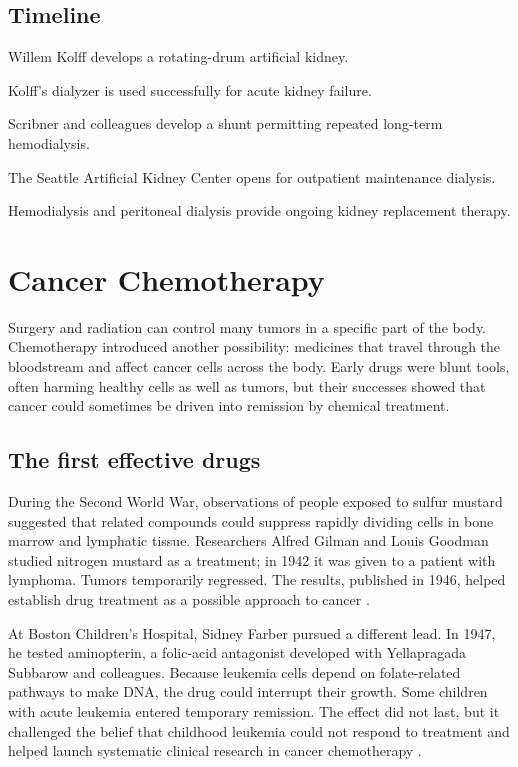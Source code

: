 \documentclass[12pt,oneside]{book}
\begin{document}
\section*{Timeline}
\begin{description}[leftmargin=2.3cm,style=nextline]
  \item[1940s] Willem Kolff develops a rotating-drum artificial kidney.
  \item[1945] Kolff's dialyzer is used successfully for acute kidney failure.
  \item[1960] Scribner and colleagues develop a shunt permitting repeated long-term hemodialysis.
  \item[1962] The Seattle Artificial Kidney Center opens for outpatient maintenance dialysis.
  \item[Today] Hemodialysis and peritoneal dialysis provide ongoing kidney replacement therapy.
\end{description}
\chapter[Cancer Chemotherapy]{Cancer Chemotherapy}

Surgery and radiation can control many tumors in a specific part of the
body. Chemotherapy introduced another possibility: medicines that travel
through the bloodstream and affect cancer cells across the body. Early
drugs were blunt tools, often harming healthy cells as well as tumors, but
their successes showed that cancer could sometimes be driven into
remission by chemical treatment.

\section{The first effective drugs}
During the Second World War, observations of people exposed to sulfur
mustard suggested that related compounds could suppress rapidly dividing
cells in bone marrow and lymphatic tissue. Researchers Alfred Gilman and
Louis Goodman studied nitrogen mustard as a treatment; in 1942 it was
given to a patient with lymphoma. Tumors temporarily regressed. The results,
published in 1946, helped establish drug treatment as a possible approach
to cancer \cite{aacrChemotherapyHistory,nciCancerMilestones}.

At Boston Children's Hospital, Sidney Farber pursued a different lead. In
1947, he tested aminopterin, a folic-acid antagonist developed with
Yellapragada Subbarow and colleagues. Because leukemia cells depend on
folate-related pathways to make DNA, the drug could interrupt their growth.
Some children with acute leukemia entered temporary remission. The effect
did not last, but it challenged the belief that childhood leukemia could
not respond to treatment and helped launch systematic clinical research
in cancer chemotherapy \cite{nciCancerMilestones,farberDanaHistory}.
\end{document}
